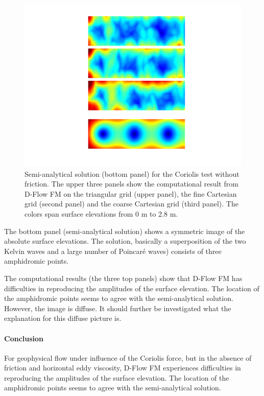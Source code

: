 \begin{figure}[h!]
\begin{center}
\includegraphics[width=1.0\columnwidth]{figures/kelvinfricno.png}
\end{center}\caption{Semi-analytical solution (bottom panel) for the Coriolis test without friction. The upper three panels show the computational result from D-Flow FM on the triangular grid (upper panel), the fine Cartesian grid (second panel) and the coarse Cartesian grid (third panel). The colors span surface elevations from 0 m to 2.8 m. \label{fig:kelvinfricno}}
\end{figure}

The bottom panel (semi-analytical solution) shows a symmetric image of the absolute surface elevations. The solution, basically a superposition of the two Kelvin waves and a large number of Poincar\'e waves) consists of three amphidromic points. 

The computational results (the three top panels) show that D-Flow FM has difficulties in reproducing the amplitudes of the surface elevation. The location of the amphidromic points seems to agree with the semi-analytical solution. However, the image is diffuse. It should further be investigated what the explanation for this diffuse picture is. 




\paragraph*{Conclusion}
For geophysical flow under influence of the Coriolis force, but in the absence of friction and horizontal eddy viscosity, D-Flow FM experiences difficulties in reproducing the amplitudes of the surface elevation. The location of the amphidromic points seems to agree with the semi-analytical solution.



